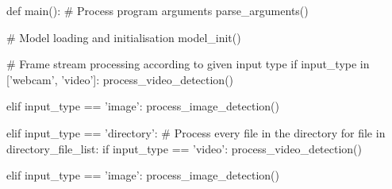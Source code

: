 \startPY
def main():
    # Process program arguments
    parse_arguments()

    # Model loading and initialisation
    model_init()

    # Frame stream processing according to given input type
    if input_type in ['webcam', 'video']:
        process_video_detection()

    elif input_type == 'image':
        process_image_detection()

    elif input_type == 'directory':
        # Process every file in the directory
        for file in directory_file_list:
            if input_type == 'video':
                process_video_detection()

            elif input_type == 'image':
                process_image_detection()

\stopPY
\stopbuffer
